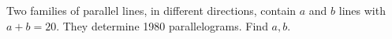 Two families of parallel lines, in different directions, contain $a$ and $b$ lines with $a+b=20$. They determine 1980 parallelograms. Find $a,b$.
